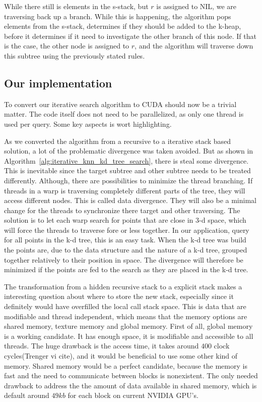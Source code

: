 While there still is elements in the s-stack, but $r$ is assigned to NIL, we are traversing back up a branch. While this is happening, the algorithm pops elements from the s-stack, determines if they should be added to the k-heap, before it determines if it need to investigate the other branch of this node. If that is the case, the other node is assigned to $r$, and the algorithm will traverse down this subtree using the previously stated rules.



\subsection{Our implementation} %
\label{sub:our_implementation}

To convert our iterative search algorithm to CUDA should now be a trivial matter. The code itself does not need to be parallelized, as only one thread is used per query. Some key aspects is wort highlighting.


As we converted the algorithm from a recursive to a iterative stack based solution, a lot of the problematic divergence was taken avoided. But as shown in Algorithm~\ref{alg:iterative_knn_kd_tree_search}, there is steal some divergence. This is inevitable since the target subtree and other subtree needs to be treated differently. Although, there are possibilities to minimize the thread branching. If threads in a warp is traversing completely different parts of the tree, they will access different nodes. This is called data divergence. They will also be a minimal change for the threads to synchronize there target and other traversing. The solution is to let each warp search for points that are close in 3-d space, which will force the threads to traverse fore or less together. In our application, query for all points in the k-d tree, this is an easy task. When the k-d tree was build the points are, due to the data structure and the nature of a k-d tree, grouped together relatively to their position in space. The divergence will therefore be minimized if the points are fed to the search as they are placed in the k-d tree.


The transformation from a hidden recursive stack to a explicit stack makes a interesting question about where to store the new stack, especially
since it definitely would have overfilled the local call stack space. This is data that are modifiable and thread independent, which means that the memory options are shared memory, texture memory and global memory. First of all, global memory is a working candidate. It has enough space, it is modifiable and accessible to all threads. The huge drawback is the access time, it takes around $400$ clock cycles(Trenger vi cite), and it would be beneficial to use some other kind of memory. Shared memory would be a perfect candidate, because the memory is fast and the need to communicate between blocks is nonexistent. The only needed drawback to address the the amount of data available in shared memory, which is default around $49 kb$ for each block on current NVIDIA GPU's.

